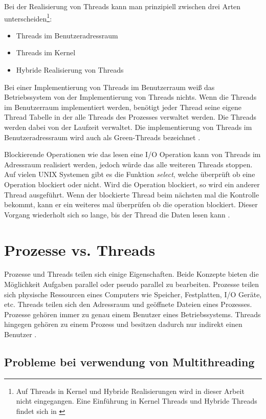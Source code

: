 Bei der Realisierung von Threads kann man prinzipiell zwischen drei Arten unterscheiden\footnote{Auf Threads in Kernel und Hybride Realisierungen wird in dieser Arbeit nicht eingegangen. Eine Einführung in Kernel Threads und Hybride Threads findet sich in \cite[p. 109-110]{tan09}}:

\begin{itemize}
  \item Threads im Benutzeradressraum
  \item Threads im Kernel 
  \item Hybride Realisierung von Threads
\end{itemize}

Bei einer Implementierung von Threads im Benutzerraum weiß das Betriebssystem von der Implementierung von Threads nichts. Wenn die Threads im Benutzerraum implementiert werden, benötigt jeder Thread seine eigene Thread Tabelle in der alle Threads des Prozesses verwaltet werden. Die Threads werden dabei von der Laufzeit verwaltet. Die implementierung von Threads im Benutzeradressraum wird auch als Green-Threads bezeichnet \cite[p. 106]{tan09}.

Blockierende Operationen wie das lesen eine I/O Operation kann von Threads im Adressraum realisiert werden, jedoch würde das alle weiteren Threads stoppen. Auf vielen UNIX Systemen gibt es die Funktion \emph{select}, welche überprüft ob eine Operation blockiert oder nicht. Wird die Operation blockiert, so wird ein anderer Thread ausgeführt. Wenn der blockierte Thread beim nächsten mal die Kontrolle bekommt, kann er ein weiteres mal überprüfen ob die operation blockiert. Dieser Vorgang wiederholt sich so lange, bis der Thread die Daten lesen kann \cite[p. 108]{tan09}. 


\section{Prozesse vs. Threads}

Prozesse und Threads teilen sich einige Eigenschaften. Beide Konzepte bieten die Möglichkeit Aufgaben parallel oder pseudo parallel zu bearbeiten. Prozesse teilen sich physische Ressourcen eines Computers wie Speicher, Festplatten, I/O Geräte, etc. Threads teilen sich den Adressraum und geöffnete Dateien eines Prozesses. Prozesse gehören immer zu genau einem Benutzer eines Betriebssystems. Threads hingegen gehören zu einem Prozess und besitzen dadurch nur indirekt einen Benutzer \cite[p. 89]{tan09}. 


\subsection{Probleme bei verwendung von Multithreading}

